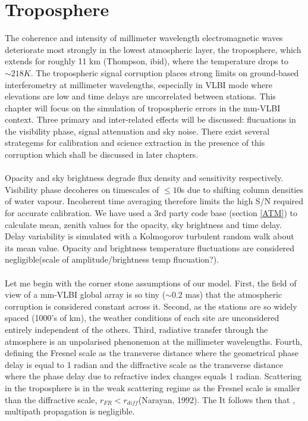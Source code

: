 \section{Troposphere}
The coherence and intensity of millimeter wavelength electromagnetic waves deteriorate most strongly in the lowest atmospheric layer, the troposphere, which extends for roughly 11 km (Thompson, ibid), where the temperature drops to $\sim218K$. The tropospheric signal corruption places strong limits on ground-based interferometry at millimeter wavelengths, especially in VLBI mode where elevations are low and time delays are uncorrelated between stations. This chapter will focus on the simulation of tropospheric errors in the mm-VLBI context. Three primary and inter-related effects will be discussed: flucuations in the visibility phase, signal attenuation and sky noise. There exist several strategems for calibration and science extraction in the presence of this corruption which shall be discussed in later chapters. \\
~\\
Opacity and sky brightness degrade flux density and sensitivity respectively. Visibility phase decoheres on timescales of $\le 10$s due to shifting column densities of water vapour. Incoherent time averaging therefore limits the high S/N required for accurate calibration. We have used a 3rd party code base (section \ref{ATM})  to calculate mean, zenith values for the opacity, sky brightness and time delay. Delay variability is simulated with a Kolmogorov turbulent random walk about its mean value. Opacity and brightness temperature fluctuations are considered negligible(scale of amplitude/brightness temp flucuation?). \\
~\\
Let me begin with the corner stone assumptions of our model. First, the field of view of a mm-VLBI global array is so tiny ($\sim0.2$  mas) that the atmospheric corruption is considered constant across it. Second, as the stations are so widely spaced (1000's of km),  the weather conditions of each site are unconsidered entirely independent of the others. Third, radiative transfer through the atmosphere is an unpolarised phenonemon at the millimeter wavelengths. Fourth, defining the Fresnel scale as the transverse distance where the geometrical phase delay is equal to 1 radian and the diffractive scale as the transverse distance where the phase delay due to refractive index changes equals  1 radian. Scattering in the troposphere is in the weak scattering regime as the Fresnel scale is smaller than the diffractive scale, $r_{FR} < r_{diff}$(Narayan, 1992). The It follows then that , multipath propagation is negligible. 

